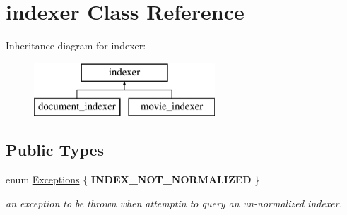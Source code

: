 \hypertarget{classindexer}{}\section{indexer Class Reference}
\label{classindexer}
Inheritance diagram for indexer\+:\begin{figure}[H]
\begin{center}
\leavevmode
\includegraphics[height=2.000000cm]{classindexer}
\end{center}
\end{figure}
\subsection*{Public Types}
\begin{DoxyCompactItemize}
\item 
\mbox{\label{classindexer_aeadc68a96ef7492b4d320eaf470fb5f6}} 
enum \hyperlink{classindexer_aeadc68a96ef7492b4d320eaf470fb5f6}{Exceptions} \{ {\bfseries I\+N\+D\+E\+X\+\_\+\+N\+O\+T\+\_\+\+N\+O\+R\+M\+A\+L\+I\+Z\+ED}
 \}\begin{DoxyCompactList}\small\item\em an exception to be thrown when attemptin to query an un-\/normalized indexer. \end{DoxyCompactList}
\end{DoxyCompactItemize}

